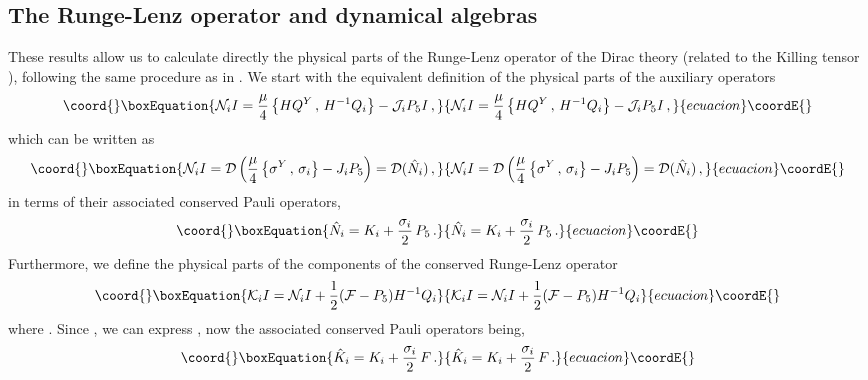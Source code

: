 \documentclass[a4paper,12pt]{article}
\begin{document}
\subsection{The Runge-Lenz operator and dynamical algebras}

These results allow us to calculate directly the physical parts of the 
Runge-Lenz operator of the Dirac theory (related to the Killing tensor 
\coordHE{}), following the same procedure as in \cite{CV3}.  
We start with the equivalent definition of the physical parts of the 
auxiliary operators \cite{CV3}   
\begin{equation}\coord{}\boxEquation{
{\cal N}_{i}I=\frac{\mu}{4}\left\{HQ^{Y}\,,\,H^{-1}Q_{i}\right\}-
{\cal J}_{i}P_{5}I\,,
}{
{\cal N}_{i}I=\frac{\mu}{4}\left\{HQ^{Y}\,,\,H^{-1}Q_{i}\right\}-
{\cal J}_{i}P_{5}I\,,
}{ecuacion}\coordE{}\end{equation}   
which can be written as 
\begin{equation}\coord{}\boxEquation{
{\cal N}_{i}I={\cal D}\left(\frac{\mu}{4}\left\{ \sigma^{Y}\,,\,\sigma_{i}
\right\}-
 J_{i}P_{5}\right)={\cal D}(\hat N_{i})\,,
}{
{\cal N}_{i}I={\cal D}\left(\frac{\mu}{4}\left\{ \sigma^{Y}\,,\,\sigma_{i}
\right\}-
 J_{i}P_{5}\right)={\cal D}(\hat N_{i})\,,
}{ecuacion}\coordE{}\end{equation}   
in terms of their associated conserved Pauli operators, 
\begin{equation}\coord{}\boxEquation{\label{Nas}
\hat N_{i}=K_{i}+\frac{\sigma_{i}}{2}\,P_{5}\,.
}{\hat N_{i}=K_{i}+\frac{\sigma_{i}}{2}\,P_{5}\,.
}{ecuacion}\coordE{}\end{equation}
Furthermore, we define the physical parts of the components of the 
conserved Runge-Lenz operator \cite{CV3,CV4} 
\begin{equation}\coord{}\boxEquation{\label{KI}
{\cal K}_{i}I={\cal N}_{i}I+ \frac{1}{2}({\cal F}-P_5)H^{-1} Q_i
}{{\cal K}_{i}I={\cal N}_{i}I+ \frac{1}{2}({\cal F}-P_5)H^{-1} Q_i
}{ecuacion}\coordE{}\end{equation}
where \coordHE{}. Since  \coordHE{},  
we can express  \coordHE{}, now the    
associated conserved Pauli operators being, 
\begin{equation}\coord{}\boxEquation{\label{Kas}
\hat K_{i}=K_{i} +\frac{\sigma_{i}}{2}\,F\,.
}{\hat K_{i}=K_{i} +\frac{\sigma_{i}}{2}\,F\,.
}{ecuacion}\coordE{}\end{equation} 
\end{document}
